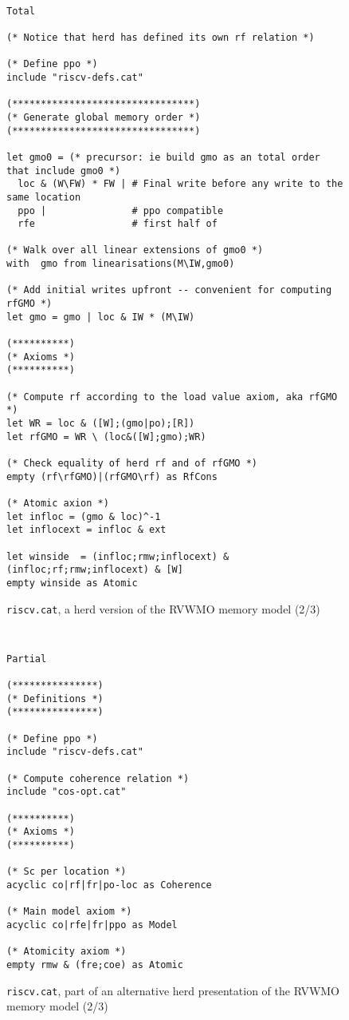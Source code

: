 \begin{figure}[h!]
  {
  \tt\bfseries\centering\footnotesize
  \begin{lstlisting}
Total

(* Notice that herd has defined its own rf relation *)

(* Define ppo *)
include "riscv-defs.cat"

(********************************)
(* Generate global memory order *)
(********************************)

let gmo0 = (* precursor: ie build gmo as an total order that include gmo0 *)
  loc & (W\FW) * FW | # Final write before any write to the same location
  ppo |               # ppo compatible
  rfe                 # first half of 

(* Walk over all linear extensions of gmo0 *)
with  gmo from linearisations(M\IW,gmo0)

(* Add initial writes upfront -- convenient for computing rfGMO *)
let gmo = gmo | loc & IW * (M\IW)

(**********)
(* Axioms *)
(**********)

(* Compute rf according to the load value axiom, aka rfGMO *)
let WR = loc & ([W];(gmo|po);[R])
let rfGMO = WR \ (loc&([W];gmo);WR)

(* Check equality of herd rf and of rfGMO *)
empty (rf\rfGMO)|(rfGMO\rf) as RfCons

(* Atomic axion *)
let infloc = (gmo & loc)^-1
let inflocext = infloc & ext

let winside  = (infloc;rmw;inflocext) & (infloc;rf;rmw;inflocext) & [W]
empty winside as Atomic
\end{lstlisting}
  }
  \caption{{\tt riscv.cat}, a herd version of the RVWMO memory model (2/3)}
  \label{fig:herd2}
\end{figure}

\begin{figure}[h!]
  {
  \tt\bfseries\centering\footnotesize
  \begin{lstlisting}
Partial

(***************)
(* Definitions *)
(***************)

(* Define ppo *)
include "riscv-defs.cat"

(* Compute coherence relation *)
include "cos-opt.cat"

(**********)
(* Axioms *)
(**********)

(* Sc per location *)
acyclic co|rf|fr|po-loc as Coherence

(* Main model axiom *)
acyclic co|rfe|fr|ppo as Model

(* Atomicity axiom *)
empty rmw & (fre;coe) as Atomic
\end{lstlisting}
  }
  \caption{{\tt riscv.cat}, part of an alternative herd presentation of the RVWMO memory model (2/3)}
  \label{fig:herd3}
\end{figure}

